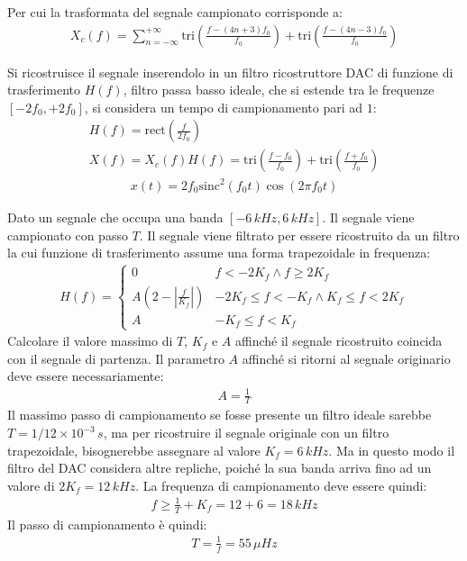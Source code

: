 \documentclass{article}
\newcommand{\rect}{\mathrm{rect}}
\newcommand{\sinc}{\mathrm{sinc}}
\newcommand{\tri}{\mathrm{tri}}
\begin{document}
Per cui la trasformata del segnale campionato corrisponde a:
\begin{gather*}
    X_c(f)=\displaystyle\sum_{n=-\infty}^{+\infty}\tri \left(\frac{f-(4n+3)f_0}{f_0}\right)+\tri \left(\frac{f-(4n-3)f_0}{f_0}\right)
\end{gather*}

Si ricostruisce il segnale inserendolo in un filtro ricostruttore DAC di funzione di trasferimento $H(f)$, filtro passa basso ideale, che si estende tra le 
frequenze $[-2f_0,+2f_0]$, si considera un tempo di campionamento pari ad $1$:
\begin{gather*}
    H(f)=\displaystyle\rect\left(\frac{f}{2f_0}\right)\\
    X(f)=X_c(f)H(f)=\displaystyle\tri \left(\frac{f-f_0}{f_0}\right)+\tri \left(\frac{f+f_0}{f_0}\right)
\end{gather*}
\begin{gather}
    x(t)=2f_0\sinc^2(f_0t)\cos(2\pi f_0t)
\end{gather} 



Dato un segnale che occupa una banda $[-6\,kHz, 6\,kHz]$. Il segnale viene campionato con passo $T$. Il segnale viene filtrato per essere ricostruito da un filtro 
la cui funzione di trasferimento assume una forma trapezoidale in frequenza:
\begin{gather*}
    H(f)=\begin{cases}
        0 &f<-2K_f\land f\geq 2K_f\\
        A\left(2-\left|\displaystyle\frac{f}{K_f}\right|\right) &-2K_f\leq f<-K_f\land K_f\leq f<2K_f\\
        A & -K_f\leq f<K_f
    \end{cases}
\end{gather*}
Calcolare il valore massimo di $T$, $K_f$ e $A$ affinché il segnale ricostruito coincida con il segnale di partenza. 
Il parametro $A$ affinché si ritorni al segnale originario deve essere necessariamente: 
\begin{gather}
    A=\displaystyle\frac{1}{T}
\end{gather}
Il massimo passo di campionamento se fosse presente un filtro ideale sarebbe $T=1/12\times10^{-3}\,s$, ma per ricostruire il segnale originale con un filtro trapezoidale, bisognerebbe 
assegnare al valore $K_f=6\,kHz$. Ma in questo modo il filtro del DAC considera altre repliche, poiché la sua banda arriva fino ad un valore di $2K_f=12\,kHz$. La frequenza di 
campionamento deve essere quindi:
\begin{gather*}
    f\geq\displaystyle\frac{1}{T}+K_f=12+6=18\,kHz
\end{gather*}
Il passo di campionamento è quindi:
\begin{gather}
    T=\displaystyle\frac{1}{f}=55\,\mu Hz
\end{gather}
\end{document}
